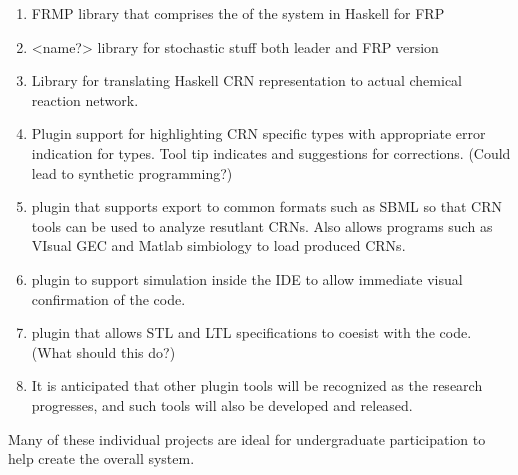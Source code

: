 \begin{enumerate}
	\item FRMP library that comprises the of the system in Haskell for FRP
	
	\item <name?>  library for stochastic stuff both leader and FRP version
	
	\item Library for translating Haskell CRN representation to actual chemical reaction network.
	
	\item Plugin support for highlighting CRN specific types with appropriate error indication for types.  Tool tip indicates and suggestions for corrections.  (Could lead to synthetic programming?)
	
	\item plugin that supports export to common formats such as SBML so that CRN tools can be used to analyze resutlant CRNs.  Also allows programs such as VIsual GEC and Matlab simbiology to load produced CRNs.
	
	\item plugin to support simulation inside the IDE to allow immediate visual confirmation of the code.
	
	\item plugin that allows STL and LTL specifications to coesist with the code.  (What should this do?)
	
	\item It is anticipated that other plugin tools will be recognized as the research progresses, and such tools will also be developed and released.
	

\end{enumerate}

Many of these individual projects are ideal for undergraduate participation to help create the overall system.


